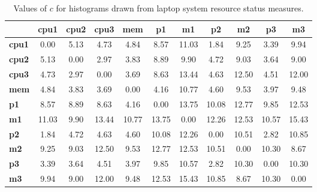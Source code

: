 \begin{table}[h!]
\scriptsize
\begin{center}
\begin{tabular}{| l | c | c | c || c || c | c || c | c || c | c ||}\hline
 & {\bf cpu1} & {\bf cpu2} & {\bf cpu3} & {\bf mem} & {\bf p1} & {\bf m1} & {\bf p2} & {\bf m2} & {\bf p3} & {\bf m3} \\\hline
{\bf cpu1} & 0.00 & 5.13 & 4.73 & 4.84 & 8.57 & 11.03 & 1.84 & 9.25 & 3.39 & 9.94 \\\hline
{\bf cpu2} & 5.13 & 0.00 & 2.97 & 3.83 & 8.89 & 9.90 & 4.72 & 9.03 & 3.64 & 9.00 \\\hline
{\bf cpu3} & 4.73 & 2.97 & 0.00 & 3.69 & 8.63 & 13.44 & 4.63 & 12.50 & 4.51 & 12.00 \\\hline\hline
{\bf mem} & 4.84 & 3.83 & 3.69 & 0.00 & 4.16 & 10.77 & 4.60 & 9.53 & 3.97 & 9.48 \\\hline\hline
{\bf p1} & 8.57 & 8.89 & 8.63 & 4.16 & 0.00 & 13.75 & 10.08 & 12.77 & 9.85 & 12.53 \\\hline
{\bf m1} & 11.03 & 9.90 & 13.44 & 10.77 & 13.75 & 0.00 & 12.26 & 12.53 & 10.57 & 15.43 \\\hline\hline
{\bf p2} & 1.84 & 4.72 & 4.63 & 4.60 & 10.08 & 12.26 & 0.00 & 10.51 & 2.82 & 10.85 \\\hline
{\bf m2} & 9.25 & 9.03 & 12.50 & 9.53 & 12.77 & 12.53 & 10.51 & 0.00 & 10.30 & 8.67 \\\hline\hline
{\bf p3} & 3.39 & 3.64 & 4.51 & 3.97 & 9.85 & 10.57 & 2.82 & 10.30 & 0.00 & 10.30 \\\hline
{\bf m3} & 9.94 & 9.00 & 12.00 & 9.48 & 12.53 & 15.43 & 10.85 & 8.67 & 10.30 & 0.00 \\\hline\hline
\end{tabular}
\caption{Values of $c$ for histograms drawn from laptop system resource status measures.}
\end{center}
\end{table}